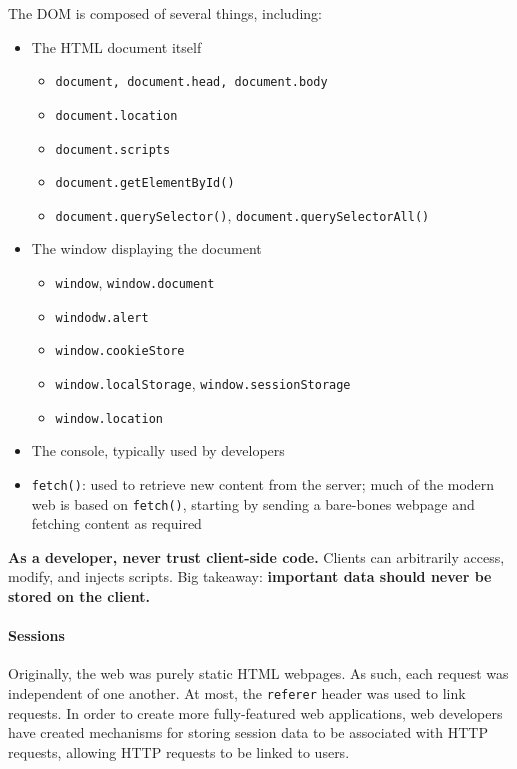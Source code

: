 The DOM is composed of several things, including:
\begin{itemize}[noitemsep]
    \item The HTML document itself
    \begin{itemize}[noitemsep]
        \item \texttt{document, document.head, document.body}
        \item \texttt{document.location}
        \item \texttt{document.scripts}
        \item \texttt{document.getElementById()}
        \item \texttt{document.querySelector()}, \texttt{document.querySelectorAll()}
    \end{itemize}
    \item The window displaying the document
    \begin{itemize}[noitemsep]
        \item \texttt{window}, \texttt{window.document}
        \item \texttt{windodw.alert}
        \item \texttt{window.cookieStore}
        \item \texttt{window.localStorage}, \texttt{window.sessionStorage}
        \item \texttt{window.location}
    \end{itemize}
    \item The console, typically used by developers
    \item \texttt{fetch()}: used to retrieve new content from the server; much of the modern web is based on \texttt{fetch()}, starting by sending a bare-bones webpage and fetching content as required
\end{itemize}

\begin{notebox}
    \textbf{As a developer, never trust client-side code.} Clients can arbitrarily access, modify, and injects scripts. Big takeaway: \textbf{important data should never be stored on the client.}
\end{notebox}

\paragraph{Sessions}
Originally, the web was purely static HTML webpages. As such, each request was independent of one another. At most, the \texttt{referer} header was used to link requests. In order to create more fully-featured web applications, web developers have created mechanisms for storing session data to be associated with HTTP requests, allowing HTTP requests to be linked to users.

